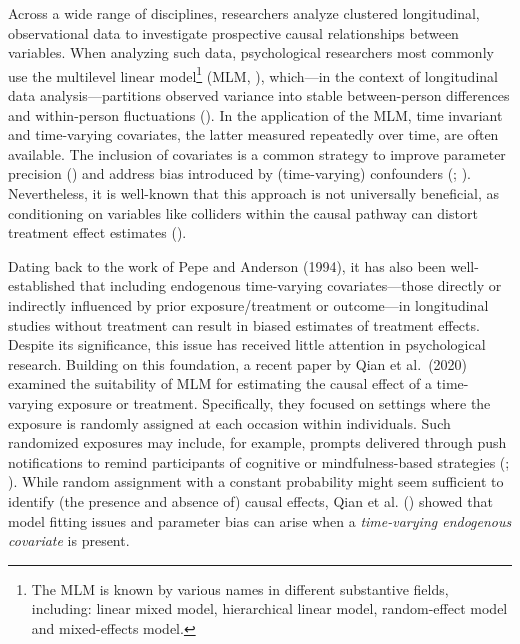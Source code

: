 \documentclass[
  11pt,
  a4paper,
]{article}
\begin{document}
Across a wide range of disciplines, researchers analyze clustered
longitudinal, observational data to investigate prospective causal
relationships between variables. When analyzing such data, psychological
researchers most commonly use the multilevel linear model\footnote{The
  MLM is known by various names in different substantive fields,
  including: linear mixed model, hierarchical linear model,
  random-effect model and mixed-effects model.} (MLM,
), which---in the context
of longitudinal data analysis---partitions observed variance into stable
between-person differences and within-person fluctuations
(). In the
application of the MLM, time invariant and time-varying covariates, the
latter measured repeatedly over time, are often available. The inclusion
of covariates is a common strategy to improve parameter precision
() and address bias
introduced by (time-varying) confounders
(;
). Nevertheless, it is well-known
that this approach is not universally beneficial, as conditioning on
variables like colliders within the causal pathway can distort treatment
effect estimates ().

Dating back to the work of Pepe and Anderson (1994), it has also been
well-established that including endogenous time-varying
covariates---those directly or indirectly influenced by prior
exposure/treatment or outcome---in longitudinal studies without
treatment can result in biased estimates of treatment effects. Despite
its significance, this issue has received little attention in
psychological research. Building on this foundation, a recent paper by
Qian et al.~(2020) examined the suitability of MLM for estimating the
causal effect of a time-varying exposure or treatment. Specifically,
they focused on settings where the exposure is randomly assigned at each
occasion within individuals. Such randomized exposures may include, for
example, prompts delivered through push notifications to remind
participants of cognitive or mindfulness-based strategies
(;
). While random assignment
with a constant probability might seem sufficient to identify (the
presence and absence of) causal effects, Qian et al.
() showed that model fitting issues and
parameter bias can arise when a \emph{time-varying endogenous covariate}
is present.
\end{document}
